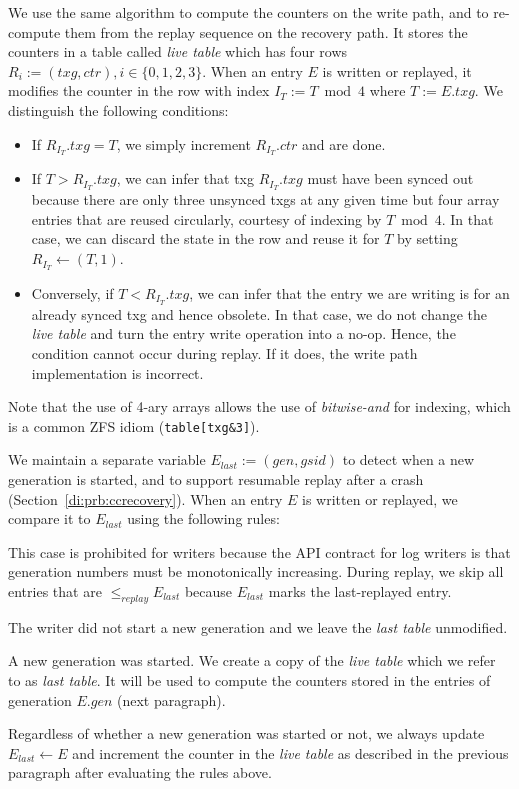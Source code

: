 \documentclass[12pt,a4paper,twoside]{book}
\begin{document}
{We use the same algorithm to compute the counters on the write path, and to re-compute them from the replay sequence on the recovery path.
It stores the counters in a table called \textit{live table} which has four rows \mbox{$R_i := (txg, ctr), i \in \{0,1,2,3\}$}.
When an entry $E$ is written or replayed, it modifies the counter in the row with index $I_T := T \bmod 4$ where $T := E.txg$.
We distinguish the following conditions:
\begin{itemize}[noitemsep]
\item If $R_{I_T}.txg = T$, we simply increment $R_{I_T}.ctr$ and are done.
\item If $T > R_{I_T}.txg$, we can infer that txg $R_{I_T}.txg$ must have been synced out because there are only three unsynced txgs at any given time but four array entries that are reused circularly, courtesy of indexing by $T \bmod 4$.
In that case, we can discard the state in the row and reuse it for $T$ by setting $R_{I_T} \leftarrow (T, 1)$.
\item Conversely, if $T < R_{I_T}.txg$, we can infer that the entry we are writing is for an already synced txg and hence obsolete.
In that case, we do not change the \textit{live table} and turn the entry write operation into a no-op.
Hence, the condition cannot occur during replay. If it does, the write path implementation is incorrect.
\end{itemize}
Note that the use of 4-ary arrays allows the use of \textit{bitwise-and} for indexing, which is a common ZFS idiom (\lstinline{table[txg&3]}).

We maintain a separate variable $E_{last} := (gen, gsid)$ to detect when a new generation is started, and to support resumable replay after a crash (Section~\ref{di:prb:ccrecovery}).
When an entry $E$ is written or replayed, we compare it to $E_{last}$ using the following rules:
\begin{description}[noitemsep,leftmargin=1.5cm,labelindent=1cm]
\item[$E < E_{last}$] This case is prohibited for writers because the API contract for log writers is that generation numbers must be monotonically increasing.
  During replay, we skip all entries that are $\le_{replay} E_{last}$ because $E_{last}$ marks the last-replayed entry.
\item[$E.gen = E_{last}.gen$] The writer did not start a new generation and we leave the \textit{last table} unmodified.
\item[$E.gen > E_{last}.gen$] A new generation was started.
    We create a copy of the \textit{live table} which we refer to as \textit{last table}.
    It will be used to compute the counters stored in the entries of generation $E.gen$ (next paragraph).
\end{description}
Regardless of whether a new generation was started or not, we always update $E_{last} \leftarrow E$ and increment the counter in the \textit{live table} as described in the previous paragraph after evaluating the rules above.

}
\end{document}
